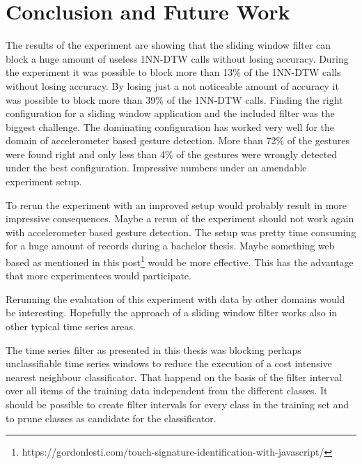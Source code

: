 \section{Conclusion and Future Work} \label{conclusion_and_future_work}
The results of the experiment are showing that the sliding window filter can block a huge amount of useless 1NN-DTW
calls without losing accuracy. During the experiment it was possible to block more than 13\% of the 1NN-DTW calls without losing accuracy. By
losing just a not noticeable amount of accuracy it was possible to block more than 39\% of the 1NN-DTW calls. Finding the
right configuration for a sliding window application and the included filter was the biggest challenge. The dominating
configuration has worked very well for the domain of accelerometer based gesture detection. More than 72\% of the
gestures were found right and only less than 4\% of the gestures were wrongly detected under the best
configuration. Impressive numbers under an amendable experiment setup.

To rerun the experiment with an improved setup would probably result in more impressive consequences. Maybe a rerun of the experiment should not work again
with accelerometer based gesture detection. The setup was pretty time consuming for a huge amount of records during a
bachelor thesis. Maybe something web based as mentioned in this
post\footnote{https://gordonlesti.com/touch-signature-identification-with-javascript/} would be more effective. This has the advantage that more
experimentees would participate.

Rerunning the evaluation of this experiment with data by other domains would be interesting. Hopefully the approach of a
sliding window filter works also in other typical time series areas.

The time series filter as presented in this thesis was blocking perhaps unclassifiable time series
windows to reduce the execution of a cost intensive nearest neighbour classificator. That happend on the basis of the
filter interval over all items of the training data independent from the different classes. It should be possible to
create filter intervals for every class in the training set and to prune classes as candidate for the classificator.
